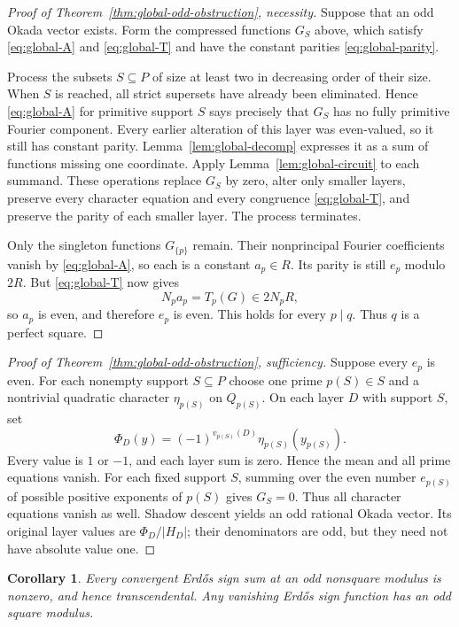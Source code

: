 \documentclass[11pt]{amsart}
\newtheorem{corollary}[theorem]{Corollary}
\theoremstyle{definition}
\theoremstyle{remark}
\numberwithin{equation}{section}
\begin{document}
\begin{proof}[Proof of Theorem~\ref{thm:global-odd-obstruction}, necessity]
Suppose that an odd Okada vector exists. Form the compressed functions
$G_S$ above, which satisfy \eqref{eq:global-A} and
\eqref{eq:global-T} and have the constant parities
\eqref{eq:global-parity}.

Process the subsets $S\subseteq P$ of size at least two in decreasing
order of their size. When $S$ is reached, all strict supersets have
already been eliminated. Hence \eqref{eq:global-A} for primitive
support $S$ says precisely that $G_S$ has no fully primitive Fourier
component. Every earlier alteration of this layer was even-valued,
so it still has constant parity. Lemma~\ref{lem:global-decomp}
expresses it as a sum of functions missing one coordinate. Apply
Lemma~\ref{lem:global-circuit} to each summand. These operations
replace $G_S$ by zero, alter only smaller layers, preserve every
character equation and every congruence \eqref{eq:global-T}, and
preserve the parity of each smaller layer. The process terminates.

Only the singleton functions $G_{\{p\}}$ remain. Their nonprincipal
Fourier coefficients vanish by \eqref{eq:global-A}, so each is a
constant $a_p\in R$. Its parity is still $e_p$ modulo $2R$.
But \eqref{eq:global-T} now gives
\[
 N_pa_p=T_p(G)\in2N_pR,
\]
so $a_p$ is even, and therefore $e_p$ is even. This holds for every
$p\mid q$. Thus $q$ is a perfect square.
\end{proof}

\begin{proof}[Proof of Theorem~\ref{thm:global-odd-obstruction}, sufficiency]
Suppose every $e_p$ is even. For each nonempty support $S\subseteq P$
choose one prime $p(S)\in S$ and a nontrivial quadratic character
$\eta_{p(S)}$ on $Q_{p(S)}$. On each layer $D$ with support $S$, set
\[
 \Phi_D(y)=(-1)^{v_{p(S)}(D)}\eta_{p(S)}(y_{p(S)}).
\]
Every value is $1$ or $-1$, and each layer sum is zero. Hence the mean
and all prime equations vanish. For each fixed support $S$, summing
over the even number $e_{p(S)}$ of possible positive exponents of
$p(S)$ gives $G_S=0$. Thus all character equations vanish as well.
Shadow descent yields an odd rational Okada vector. Its original
layer values are $\Phi_D/|H_D|$; their denominators are odd, but they
need not have absolute value one.
\end{proof}

\begin{corollary}
Every convergent Erd\H{o}s sign sum at an odd nonsquare modulus is
nonzero, and hence transcendental. Any vanishing Erd\H{o}s sign
function has an odd square modulus.
\end{corollary}
\end{document}
